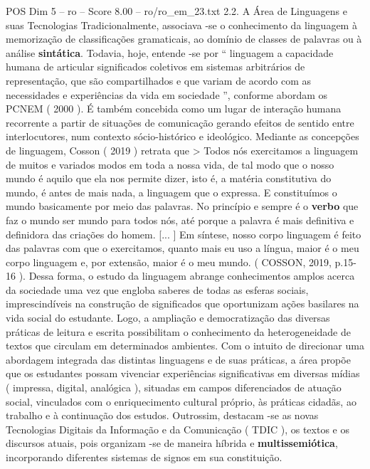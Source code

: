\begin{textsample}{POS Dim 5 – ro – Score 8.00 – ro/ro\_em\_23.txt}  \label{ex:f5_pos_119}
2.2.
A Área de Linguagens e suas Tecnologias Tradicionalmente, associava -se o conhecimento da linguagem à memorização de classificações gramaticais, ao domínio de classes de palavras ou à análise \textbf{sintática}.
Todavia, hoje, entende -se por “ linguagem a capacidade humana de articular significados coletivos em sistemas arbitrários de representação, que são compartilhados e que variam de acordo com as necessidades e experiências da vida em sociedade ”, conforme abordam os PCNEM ( 2000 ).
É também concebida como um lugar de interação humana recorrente a partir de situações de comunicação gerando efeitos de sentido entre interlocutores, num contexto sócio-histórico e ideológico.
Mediante as concepções de linguagem, Cosson ( 2019 ) retrata que > Todos nós exercitamos a linguagem de muitos e variados modos em toda a nossa vida, de tal modo que o nosso mundo é aquilo que ela nos permite dizer, isto é, a matéria constitutiva do mundo, é antes de mais nada, a linguagem que o expressa.
E constituímos o mundo basicamente por meio das palavras.
No princípio e sempre é o \textbf{verbo} que faz o mundo ser mundo para todos nós, até porque a palavra é mais definitiva e definidora das criações do homem. [... ] Em síntese, nosso corpo linguagem é feito das palavras com que o exercitamos, quanto mais eu uso a língua, maior é o meu corpo linguagem e, por extensão, maior é o meu mundo. ( COSSON, 2019, p.15-16 ).
Dessa forma, o estudo da linguagem abrange conhecimentos amplos acerca da sociedade uma vez que engloba saberes de todas as esferas sociais, imprescindíveis na construção de significados que oportunizam ações basilares na vida social do estudante.
Logo, a ampliação e democratização das diversas práticas de leitura e escrita possibilitam o conhecimento da heterogeneidade de textos que circulam em determinados ambientes.
Com o intuito de direcionar uma abordagem integrada das distintas linguagens e de suas práticas, a área propõe que os estudantes possam vivenciar experiências significativas em diversas mídias ( impressa, digital, analógica ), situadas em campos diferenciados de atuação social, vinculados com o enriquecimento cultural próprio, às práticas cidadãs, ao trabalho e à continuação dos estudos.
Outrossim, destacam -se as novas Tecnologias Digitais da Informação e da Comunicação ( TDIC ), os textos e os discursos atuais, pois organizam -se de maneira híbrida e \textbf{multissemiótica}, incorporando diferentes sistemas de signos em sua constituição.

\end{textsample}
